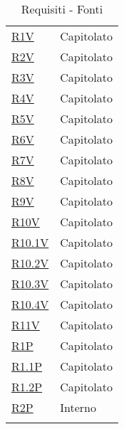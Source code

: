 \begin{center}
\begin{longtable}[!h]{p{50px} p{50px}}
        \hyperref[tab:RequisitiVincolo]{R1V}         & Capitolato                    \\
        \hyperref[tab:RequisitiVincolo]{R2V}         & Capitolato                    \\
        \hyperref[tab:RequisitiVincolo]{R3V}         & Capitolato                    \\
        \hyperref[tab:RequisitiVincolo]{R4V}         & Capitolato                    \\
        \hyperref[tab:RequisitiVincolo]{R5V}         & Capitolato                    \\
        \hyperref[tab:RequisitiVincolo]{R6V}         & Capitolato                    \\
        \hyperref[tab:RequisitiVincolo]{R7V}         & Capitolato                    \\
        \hyperref[tab:RequisitiVincolo]{R8V}         & Capitolato                    \\
        \hyperref[tab:RequisitiVincolo]{R9V}         & Capitolato                    \\
        \hyperref[tab:RequisitiVincolo]{R10V}        & Capitolato                    \\
        \hyperref[tab:RequisitiVincolo]{R10.1V}      & Capitolato                    \\
        \hyperref[tab:RequisitiVincolo]{R10.2V}      & Capitolato                    \\
        \hyperref[tab:RequisitiVincolo]{R10.3V}      & Capitolato                    \\
        \hyperref[tab:RequisitiVincolo]{R10.4V}      & Capitolato                    \\
        \hyperref[tab:RequisitiVincolo]{R11V}      & Capitolato                    \\

        \hyperref[tab:RequisitiPrestazionali]{R1P}   & Capitolato                    \\
        \hyperref[tab:RequisitiPrestazionali]{R1.1P} & Capitolato                    \\
        \hyperref[tab:RequisitiPrestazionali]{R1.2P} & Capitolato                    \\
        \hyperref[tab:RequisitiPrestazionali]{R2P}   & Interno                       \\

        \rowcolor{white}\caption{Requisiti - Fonti}
    \end{longtable}
\end{center}